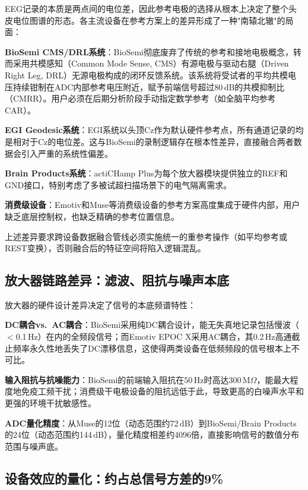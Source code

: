 \documentclass[12pt, a4paper]{article}
\begin{document}
EEG记录的本质是两点间的电位差，因此参考电极的选择从根本上决定了整个头皮电位图谱的形态。各主流设备在参考方案上的差异形成了一种"南辕北辙"的局面：

\textbf{BioSemi CMS/DRL系统}：BioSemi彻底废弃了传统的参考和接地电极概念，转而采用共模感知（Common Mode Sense, CMS）有源电极与驱动右腿（Driven Right Leg, DRL）无源电极构成的闭环反馈系统\citep{BioSemiSpecs}。该系统将受试者的平均共模电压持续钳制在ADC内部参考电压附近，赋予前端信号超过80\,dB的共模抑制比（CMRR）。用户必须在后期分析阶段手动指定数学参考（如全脑平均参考CAR）。

\textbf{EGI Geodesic系统}：EGI系统以头顶Cz作为默认硬件参考点\citep{BIDSspecEEG}，所有通道记录的均是相对于Cz的电位差。这与BioSemi的录制逻辑存在根本性差异，直接融合两者数据会引入严重的系统性偏差。

\textbf{Brain Products系统}：actiCHamp Plus为每个放大器模块提供独立的REF和GND接口，特别考虑了多被试超扫描场景下的电气隔离需求\citep{BrainProductsSpecs}。

\textbf{消费级设备}：Emotiv和Muse等消费级设备的参考方案高度集成于硬件内部，用户缺乏底层控制权，也缺乏精确的参考位置信息\citep{EmotivSpecs}。

上述差异要求跨设备数据融合管线必须实施统一的重参考操作（如平均参考或REST变换），否则融合后的特征空间将陷入逻辑混乱\citep{Chella2016reference}。

\subsection{放大器链路差异：滤波、阻抗与噪声本底}

放大器的硬件设计差异决定了信号的本底频谱特性：

\textbf{DC耦合vs.\ AC耦合}：BioSemi采用纯DC耦合设计，能无失真地记录包括慢波（$<$0.1\,Hz）在内的全频段信号\citep{BioSemiSpecs}；而Emotiv EPOC X采用AC耦合，其0.2\,Hz高通截止频率永久性地丢失了DC漂移信息，这使得两类设备在低频频段的信号根本上不可比。

\textbf{输入阻抗与抗噪能力}：BioSemi的前端输入阻抗在50\,Hz时高达300\,M$\Omega$，能最大程度地免疫工频干扰；消费级干电极设备的阻抗远低于此，导致更高的白噪声水平和更强的环境干扰敏感性\citep{Ratti2017systems}。

\textbf{ADC量化精度}：从Muse的12位（动态范围约72\,dB）到BioSemi/Brain Products的24位（动态范围约144\,dB），量化精度相差约4096倍，直接影响信号的数值分布范围与噪声底\citep{Sensors2024spectral}。

\subsection{设备效应的量化：约占总信号方差的9\%}
\end{document}
